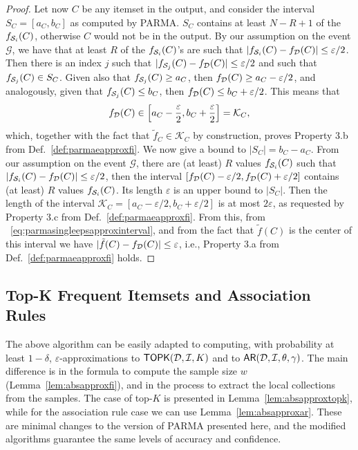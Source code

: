 \begin{proof}
  Let now $C$ be any itemset in the output, and consider the interval
  $S_C=[a_C,b_C]$ as computed by PARMA. $S_C$ contains at least $N-R+1$ of
  the $f_{{\cal S}_i}(C)$, otherwise $C$ would not be in the output. By our
  assumption on the event $\mathcal{G}$, we have
  that at least $R$ of the $f_{{\cal S}_i}(C)$'s are such that
  $|f_{{\cal S}_i}(C)-f_{\cal D}(C)|\le\varepsilon/2$. Then there is an index $j$ such
  that $|f_{{\cal S}_j}(C)-f_{\cal D}(C)|\le\varepsilon/2$ and such that
  $f_{{\cal S}_j}(C)\in S_C$.
  Given also that $f_{{\cal S}_j}(C)\ge a_C$, then $f_{\cal D}(C)\ge
  a_C-\varepsilon/2$, and analogously, given that $f_{{\cal S}_j}(C)\le b_C$, then
  $f_{\cal D}(C)\le b_C+\varepsilon/2$. This means that
  \begin{equation}\label{eq:parmasingleepsapproxinterval}
    f_{\cal D}(C)\in
    \left[a_C-\frac{\varepsilon}{2},
    b_C+\frac{\varepsilon}{2}\right]=\mathcal{K}_C,
  \end{equation}
  which, together with the fact that $\tilde{f}_C\in\mathcal{K}_C$ by
  construction, proves Property 3.b from Def.~\ref{def:parmaeapproxfi}.
  We now give a bound to $|S_C|=b_C-a_C$. From our
  assumption on the event $\mathcal{G}$, there are (at least) $R$ values
  $f_{{\cal S}_i}(C)$ such that $|f_{{\cal S}_i}(C)-f_{\cal D}(C)|\le\varepsilon/2$, then the
  interval $[f_{\cal D}(C)-\varepsilon/2,f_{\cal D}(C)+\varepsilon/2]$ contains (at least)
  $R$ values $f_{{\cal S}_i}(C)$. Its length $\varepsilon$ is an upper bound to
  $|S_C|$. Then the length of the interval
  $\mathcal{K}_C=[a_C-\varepsilon/2,b_C+\varepsilon/2]$ is at most
  $2\varepsilon$, as requested by Property 3.c from
  Def.~\ref{def:parmaeapproxfi}. From this, from ~\eqref{eq:parmasingleepsapproxinterval}, and
  from the fact that $\tilde{f}(C)$ is the center of this interval we have
  $|\tilde{f}(C)-f_{\cal D}(C)|\le\varepsilon$, i.e., Property 3.a from
  Def.~\ref{def:parmaeapproxfi} holds.
\end{proof}

\subsection{Top-K Frequent Itemsets and Association Rules}\label{sec:parmaeapproxtopk}
The above algorithm can be easily adapted to computing, with probability at
least $1-\delta$, $\varepsilon$-approximations to $\mathsf{TOPK}({\cal D},{\cal I},K)$ and to
$\mathsf{AR}({\cal D},{\cal I},\theta,\gamma)$. The main difference is in the formula to compute
the sample size $w$ (Lemma~\ref{lem:absapproxfi}), and in the process
to extract the local collections from the samples. The case of top-$K$ is
presented in Lemma~\ref{lem:absapproxtopk}, while for the association rule case
we can use Lemma~\ref{lem:absapproxar}. These are minimal changes to the version
of PARMA presented here, and the modified algorithms guarantee the same levels
of accuracy and confidence.

